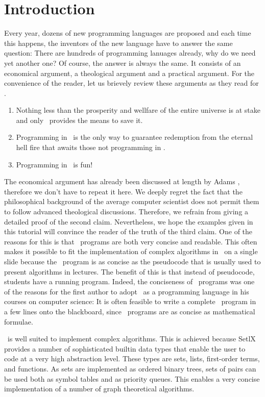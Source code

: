 \chapter{Introduction}
Every year, dozens of new programming languages are proposed and each time this
happens,  the inventors of the new language have to answer the same question: 
There are hundreds of programming lanuages already, why do we need yet another one?  
Of course, the answer is always the same.  It consists of an economical argument, a
theological argument and a practical argument. For the
convenience of the reader, let us brievely review these arguments as they read for \setlx.  
\begin{enumerate}
\item Nothing less than the prosperity and wellfare of the entire universe is at
      stake and only \setlx\ provides the means to save it.
\item Programming in \setlx\ is the only way to guarantee redemption from 
      the eternal hell fire that awaits those not programming in \setlx.
\item Programming in \setlx\ is fun!
\end{enumerate}
The economical argument has already been discussed at length by Adams \cite{adams:1980},
therefore we don't have to repeat it here.   We deeply
regret the fact that the philosophical background of the average computer scientist does not permit
them to follow advanced theological discussions.  Therefore, we refrain from giving a
detailed proof of the second claim.  Nevertheless, we hope the examples given in this
tutorial will convince the reader of the truth of the third claim.
  One of the reasons for this is that \setlx\ programs are both very concise and
readable.  This often makes it possible to fit the implementation of complex algorithms in \setlx\ on a
single slide because the \setlx\ program is as concise as the pseudocode that is usually used to
present algorithms in lectures.  The benefit of this is that instead of pseudocode, students have a
running program.  Indeed, the conciseness of \setlx\ programs was one of the reasons for
the first author to adopt \setlx\ as a programming language in his courses on computer
science: It is often feasible to write a complete \setlx\ program in a few lines 
onto the blackboard, since \setlx\ programs are as concise as mathematical formulae.


\setlx\ is well suited to implement complex algorithms. This is achieved because SetlX
provides a number of sophisticated builtin data types that enable the user to code at a very high
abstraction level.
These types are sets, lists, first-order terms, and functions.  
As sets are implemented as ordered binary trees, sets of pairs can be used both as symbol
tables and as priority queues.  This enables a very concise implementation 
of a number of graph theoretical algorithms.

